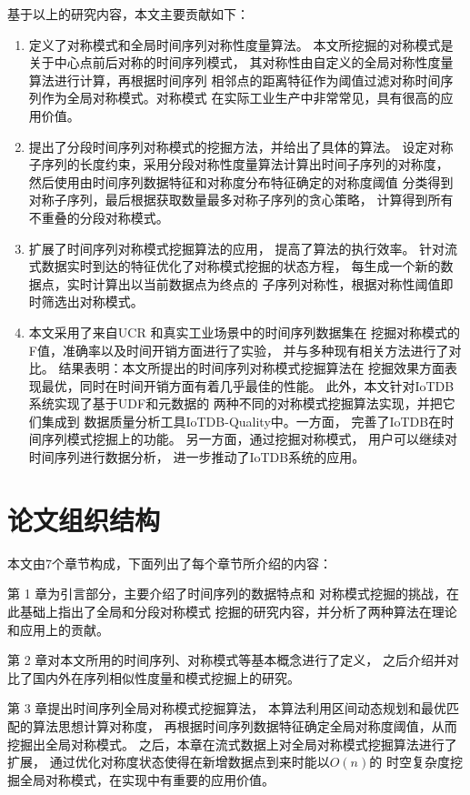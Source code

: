 基于以上的研究内容，本文主要贡献如下：
\begin{enumerate}
\item 定义了对称模式和全局时间序列对称性度量算法。
本文所挖掘的对称模式是关于中心点前后对称的时间序列模式，
其对称性由自定义的全局对称性度量算法进行计算，再根据时间序列
相邻点的距离特征作为阈值过滤对称时间序列作为全局对称模式。对称模式
在实际工业生产中非常常见，具有很高的应用价值。
\item 提出了分段时间序列对称模式的挖掘方法，并给出了具体的算法。
设定对称子序列的长度约束，采用分段对称性度量算法计算出时间子序列的对称度，
然后使用由时间序列数据特征和对称度分布特征确定的对称度阈值
分类得到对称子序列，最后根据获取数量最多对称子序列的贪心策略，
计算得到所有不重叠的分段对称模式。
\item 扩展了时间序列对称模式挖掘算法的应用，
提高了算法的执行效率。
针对流式数据实时到达的特征优化了对称模式挖掘的状态方程，
每生成一个新的数据点，实时计算出以当前数据点为终点的
子序列对称性，根据对称性阈值即时筛选出对称模式。
\item 本文采用了来自UCR\cite{DBLP:journals/ieeejas/DauBKYZGRK19}
和真实工业场景中的时间序列数据集在
挖掘对称模式的F值，准确率以及时间开销方面进行了实验，
并与多种现有相关方法进行了对比。
结果表明：本文所提出的时间序列对称模式挖掘算法在
挖掘效果方面表现最优，同时在时间开销方面有着几乎最佳的性能。
此外，本文针对IoTDB系统实现了基于UDF和元数据的
两种不同的对称模式挖掘算法实现，并把它们集成到
数据质量分析工具IoTDB-Quality中。一方面，
完善了IoTDB在时间序列模式挖掘上的功能。
另一方面，通过挖掘对称模式，
用户可以继续对时间序列进行数据分析，
进一步推动了IoTDB系统的应用。
\end{enumerate}

\section{论文组织结构}

本文由7个章节构成，下面列出了每个章节所介绍的内容：

第 1 章为引言部分，主要介绍了时间序列的数据特点和
对称模式挖掘的挑战，在此基础上指出了全局和分段对称模式
挖掘的研究内容，并分析了两种算法在理论和应用上的贡献。

第 2 章对本文所用的时间序列、对称模式等基本概念进行了定义，
之后介绍并对比了国内外在序列相似性度量和模式挖掘上的研究。

第 3 章提出时间序列全局对称模式挖掘算法，
本算法利用区间动态规划和最优匹配的算法思想计算对称度，
再根据时间序列数据特征确定全局对称度阈值，从而挖掘出全局对称模式。
之后，本章在流式数据上对全局对称模式挖掘算法进行了扩展，
通过优化对称度状态使得在新增数据点到来时能以$O(n)$的
时空复杂度挖掘全局对称模式，在实现中有重要的应用价值。

